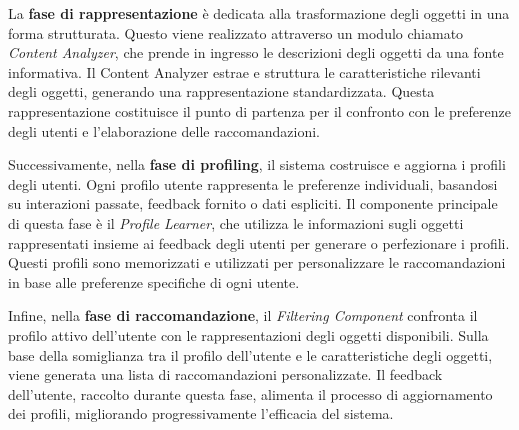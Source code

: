\documentclass{report}
\begin{document}
	La \textbf{fase di rappresentazione} è dedicata alla trasformazione degli oggetti in una forma strutturata. Questo viene realizzato attraverso un modulo chiamato \textit{Content Analyzer}, che prende in ingresso le descrizioni degli oggetti da una fonte informativa. Il Content Analyzer estrae e struttura le caratteristiche rilevanti degli oggetti, generando una rappresentazione standardizzata. Questa rappresentazione costituisce il punto di partenza per il confronto con le preferenze degli utenti e l'elaborazione delle raccomandazioni.

	Successivamente, nella \textbf{fase di profiling}, il sistema costruisce e aggiorna i profili degli utenti. Ogni profilo utente rappresenta le preferenze individuali, basandosi su interazioni passate, feedback fornito o dati espliciti. Il componente principale di questa fase è il \textit{Profile Learner}, che utilizza le informazioni sugli oggetti rappresentati insieme ai feedback degli utenti per generare o perfezionare i profili. Questi profili sono memorizzati e utilizzati per personalizzare le raccomandazioni in base alle preferenze specifiche di ogni utente.

	Infine, nella \textbf{fase di raccomandazione}, il \textit{Filtering Component} confronta il profilo attivo dell'utente con le rappresentazioni degli oggetti disponibili. Sulla base della somiglianza tra il profilo dell'utente e le caratteristiche degli oggetti, viene generata una lista di raccomandazioni personalizzate. Il feedback dell'utente, raccolto durante questa fase, alimenta il processo di aggiornamento dei profili, migliorando progressivamente l'efficacia del sistema.
\end{document}
